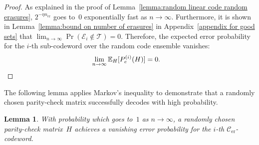 \documentclass[journal,letterpaper,onecolumn,11pt]{IEEEtran}
\newcommand{\cC}{\mathcal{C}}
\newcommand{\cE}{\mathcal{E}}
\newtheorem{lemma}{Lemma}
\begin{document}
\begin{proof}
    
    
    
    As explained in the proof of Lemma~\ref{lemma:random linear code random erasures},
    $2^{-\eta n_{\mathrm{er}}}$ goes to~$0$ exponentially fast as $n \to \infty$. 
    Furthermore, it is shown in Lemma~\ref{lemma:bound on number of erasures} in Appendix~\ref{appendix for good sets} that $\lim_{n\to\infty}\Pr(\cE_i \notin \mathcal{T}) = 0$. Therefore, the expected error probability for the $i$-th sub-codeword over the random code ensemble vanishes:
    \begin{align*}
       \lim_{n \to \infty} \mathbb{E}_H[P_e^{(i)}(H)]&= 0.\qedhere 
    \end{align*}    
\end{proof}
 The following lemma applies Markov's inequality to demonstrate that a randomly chosen parity-check matrix successfully decodes with high probability.
\begin{lemma}\label{lemma:high_probability_existence} 
    With probability which goes to~$1$ as $n\to \infty$, a randomly chosen parity-check matrix~$H$ 
    achieves a vanishing error probability for the $i$-th $\cC_\text{er}$-codeword.
\end{lemma}
\end{document}
